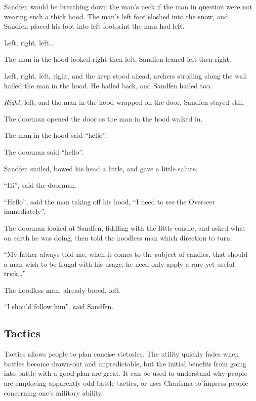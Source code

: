 \begin{multicols}{2}
\begin{exampletext}
  Sandfen would be breathing down the man's neck if the man in question were not wearing such a thick hood.
  The man's left foot sloshed into the snow, and Sandfen placed his foot into left footprint the man had left.

  Left, right, left\ldots

  The man in the hood looked right then left; Sandfen leaned left then right.

  Left, right, left, right, and the keep stood ahead, archers strolling along the wall hailed the man in the hood.
  He hailed back, and Sandfen hailed too.

  \emph{Right}, left, and the man in the hood wrapped on the door.
  Sandfen stayed still.

  The doorman opened the door as the man in the hood walked in.

  The man in the hood said ``hello''.

  The doorman said ``hello''.

  Sandfen smiled, bowed his head a little, and gave a little salute.

  ``Hi'', said the doorman.

  ``Hello'', said the man taking off his hood, ``I need to see the Overseer immediately''.

  The doorman looked at Sandfen, fiddling with the little candle, and asked what on earth he was doing, then told the hoodless man which direction to turn.

  ``My father always told me, when it comes to the subject of candles, that should  a man wish to be frugal with his usage, he need only apply a rare yet useful trick\ldots''

  The hoodless man, already bored, left.

  ``I should follow him'', said Sandfen.
\end{exampletext}

\subsection{Tactics}

Tactics allows people to plan concise victories.
The utility quickly fades when battles become drawn-out and unpredictable, but the initial benefits from going into battle with a good plan are great.
It can be used to understand why people are employing apparently odd battle-tactics, or uses Charisma to impress people concerning one's military ability.


\end{multicols}
